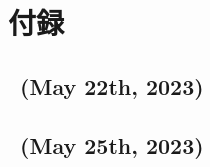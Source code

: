 \setcounter{subsection}{0}
\renewcommand{\thelstlisting}{\thesubsection-\arabic{lstlisting}}
\renewcommand{\thesubsection}{\Alph{subsection}}
\makeatletter
{}
\makeatother
{}
\section*{付録}
\subsection{\kadaia\ (May 22th, 2023)}

% 
\subsection{\kadaib\ (May 25th, 2023)}
